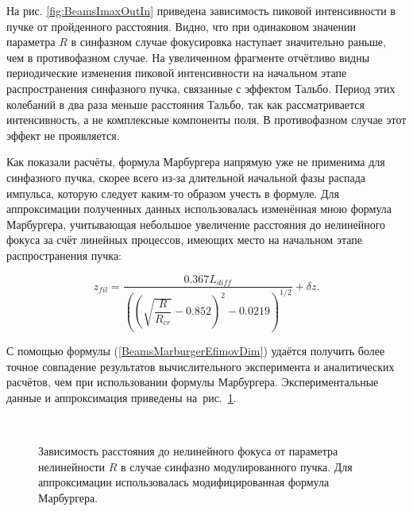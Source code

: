 
На рис.  \ref{fig:BeamsImaxOutIn} приведена зависимость пиковой интенсивности в пучке от пройденного расстояния.
Видно, что при одинаковом значении параметра $R$ в синфазном случае фокусировка наступает значительно раньше, чем в противофазном случае.
На увеличенном фрагменте отчётливо видны периодические изменения пиковой интенсивности на начальном этапе распространения синфазного пучка,
связанные с эффектом Тальбо. Период этих колебаний в два раза меньше расстояния Тальбо, так как рассматривается интенсивность,
а не комплексные компоненты поля. В противофазном случае этот эффект не проявляется.

Как показали расчёты, формула Марбургера напрямую уже не применима для синфазного пучка,
скорее всего из-за длительной начальной фазы распада импульса, которую следует
каким-то образом учесть в формуле. Для аппроксимации полученных данных использовалась изменённая мною формула Марбургера,
учитывающая небольшое увеличение расстояния до нелинейного фокуса за счёт линейных процессов, имеющих место на начальном этапе распространения пучка:

\begin{equation}\label{BeamsMarburgerEfimovDim}
z_{fil} = \dfrac{0.367 L_{diff}}{\left( \left( \sqrt{\dfrac{R}{R_{cr}}} - 0.852 \right)^2 - 0.0219 \right)^{1/2}} + \delta z.
\end{equation}

С помощью формулы (\ref{BeamsMarburgerEfimovDim}) удаётся получить более точное совпадение результатов вычислительного эксперимента и аналитических расчётов,
чем при использовании формулы Марбургера. Экспериментальные данные и аппроксимация приведены на~рис.~\ref{fig:BeamsZfillInphase}.


\begin{figure}[H]
    \begin{center}
        \begin{minipage}{\minipagewidthtwo}
        \end{minipage}
        \\[1ex]
        \caption{Зависимость расстояния до нелинейного фокуса от параметра нелинейности $R$ в случае синфазно модулированного пучка. Для аппроксимации использовалась модифицированная формула Марбургера.}
        \label{fig:BeamsZfillInphase}
    \end{center}
\end{figure}

